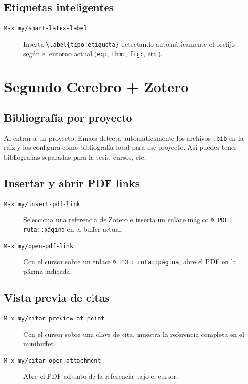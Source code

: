 \documentclass[11pt]{article}
\begin{document}
\subsection{Etiquetas inteligentes}
\label{sec:org085c376}
\begin{description}
\item[{\texttt{M-x my/smart-latex-label}}] Inserta \texttt{\textbackslash{}label\{tipo:etiqueta\}} detectando automáticamente el prefijo según el entorno actual (\texttt{eq:}, \texttt{thm:}, \texttt{fig:}, etc.).
\end{description}
\section{Segundo Cerebro + Zotero}
\label{sec:orgae561cb}

\subsection{Bibliografía por proyecto}
\label{sec:org21d24fa}
Al entrar a un proyecto, Emacs detecta automáticamente los archivos \texttt{.bib} en la raíz y los configura como bibliografía local para ese proyecto. Así puedes tener bibliografías separadas para la tesis, cursos, etc.
\subsection{Insertar y abrir PDF links}
\label{sec:org562dfac}
\begin{description}
\item[{\texttt{M-x my/insert-pdf-link}}] Selecciona una referencia de Zotero e inserta un enlace mágico \texttt{\% PDF: ruta::página} en el buffer actual.
\item[{\texttt{M-x my/open-pdf-link}}] Con el cursor sobre un enlace \texttt{\% PDF: ruta::página}, abre el PDF en la página indicada.
\end{description}
\subsection{Vista previa de citas}
\label{sec:orgfe4456d}
\begin{description}
\item[{\texttt{M-x my/citar-preview-at-point}}] Con el cursor sobre una clave de cita, muestra la referencia completa en el minibuffer.
\item[{\texttt{M-x my/citar-open-attachment}}] Abre el PDF adjunto de la referencia bajo el cursor.
\end{description}
\end{document}
